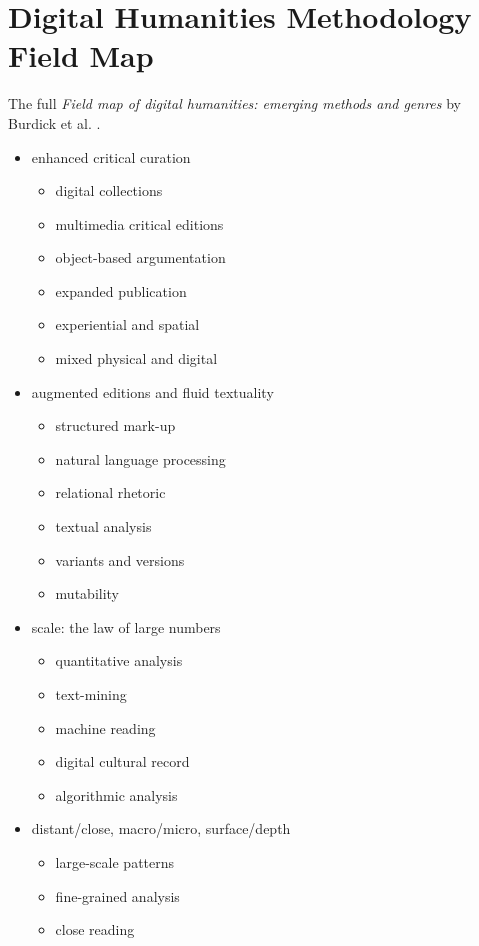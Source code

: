 \section{Digital Humanities Methodology Field Map}
\label{s:dhmap}

The full \textit{Field map of digital humanities: emerging methods and genres} by Burdick et al. \citeyear[p.29-60]{Burdick2012}.

\begin{itemize}
  \item enhanced critical curation
  \begin{itemize}
    \item digital collections
    \item multimedia critical editions
    \item object-based argumentation
    \item expanded publication
    \item experiential and spatial
    \item mixed physical and digital
  \end{itemize}
  \item augmented editions and fluid textuality
  \begin{itemize}
    \item structured mark-up
    \item	natural language processing
    \item	relational rhetoric
    \item	textual analysis
    \item	variants and versions
    \item	mutability
  \end{itemize}
  \item scale: the law of large numbers
  \begin{itemize}
    \item quantitative analysis
    \item	text-mining
    \item	machine reading
    \item	digital cultural record
    \item	algorithmic analysis
  \end{itemize}
  \item distant/close, macro/micro, surface/depth
  \begin{itemize}
    \item large-scale patterns
    \item	fine-grained analysis
    \item	close reading

\end{itemize}
\end{itemize}
